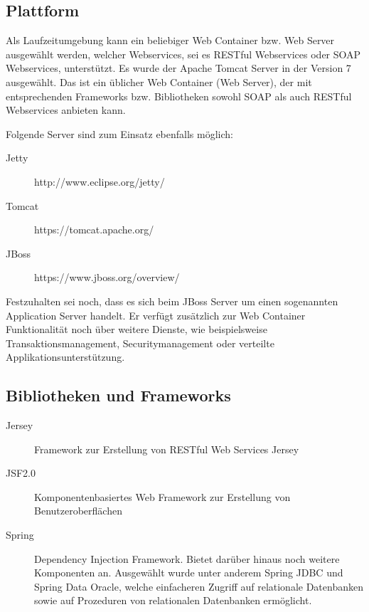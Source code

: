 \subsection{Plattform}  \label{sec:plattform}
Als Laufzeitumgebung kann ein beliebiger Web Container bzw. Web Server ausgewählt werden, welcher Webservices, sei es \gls{REST}ful \glspl{Webservice} oder \gls{SOAP} \glspl{Webservice}, unterstützt. 
Es wurde der \gls{Apache Tomcat} Server in der Version 7 ausgewählt. Das ist ein üblicher Web Container (Web Server), der mit entsprechenden Frameworks bzw. Bibliotheken sowohl \gls{SOAP} als auch \gls{REST}ful \glspl{Webservice} anbieten kann. 

Folgende Server sind zum Einsatz ebenfalls möglich:

\begin{description}
\item[Jetty] http://www.eclipse.org/jetty/
\item[Tomcat] https://tomcat.apache.org/
\item[JBoss] https://www.jboss.org/overview/
\end{description}

Festzuhalten sei noch, dass es sich beim JBoss Server um einen sogenannten Application Server handelt. Er verfügt zusätzlich zur Web Container Funktionalität noch über weitere Dienste, wie beispielsweise Transaktionsmanagement, Securitymanagement oder verteilte Applikationsunterstützung. 

\subsection{Bibliotheken und Frameworks} \label{sec:bibliotheken_und_frameworks}
\begin{description}

\item[Jersey] Framework zur Erstellung von RESTful Web Services \gls{Jersey}
\item[JSF2.0] Komponentenbasiertes Web Framework zur Erstellung von Benutzer\-oberflächen 
\item[Spring] Dependency Injection Framework. Bietet darüber hinaus noch weitere Komponenten an. Ausgewählt wurde unter anderem \gls{Spring} JDBC und \gls{Spring} Data Oracle, welche einfacheren Zugriff auf relationale Datenbanken sowie auf Prozeduren von relationalen Datenbanken ermöglicht.  
    
\end{description}

